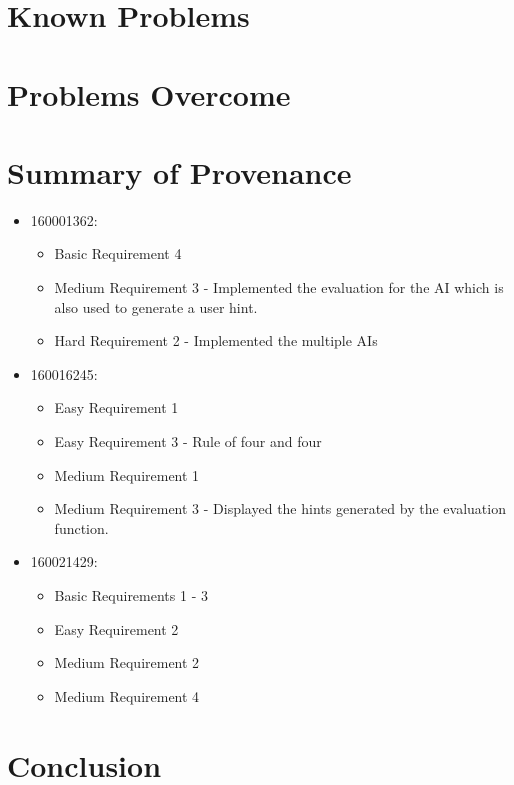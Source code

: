 \documentclass[11]{article}
\begin{document}
		
	\section{Known Problems}
		
		
	\section{Problems Overcome}
	

	\section{Summary of Provenance}
			\begin{itemize}
				\item 160001362:
					\begin{itemize}
						\item Basic Requirement 4
						\item Medium Requirement 3 - Implemented the evaluation for the AI which is also used to generate a user hint.
						\item Hard Requirement 2 - Implemented the multiple AIs
					\end{itemize}
					
				\item 160016245:
					\begin{itemize}
						\item Easy Requirement 1
						\item Easy Requirement 3 - Rule of four and four
						\item Medium Requirement 1
						\item Medium Requirement 3 - Displayed the hints generated by the evaluation function.
					\end{itemize}
					
				\item 160021429:
					\begin{itemize}
						\item Basic Requirements 1 - 3
						\item Easy Requirement 2
						\item Medium Requirement 2
						\item Medium Requirement 4
					\end{itemize}
			\end{itemize}
				
	
\section{Conclusion}
\end{document}
